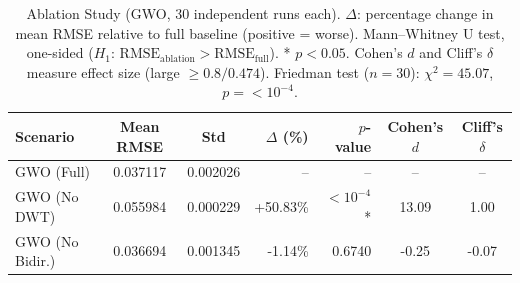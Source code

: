 \begin{table}[htbp]
\centering
\caption{Ablation Study (GWO, 30 independent runs each).
$\Delta$: percentage change in mean RMSE relative to full baseline (positive = worse).
Mann--Whitney U test, one-sided ($H_1$: $\mathrm{RMSE}_{\text{ablation}} > \mathrm{RMSE}_{\text{full}}$).
* $p < 0.05$. Cohen's $d$ and Cliff's $\delta$ measure effect size (large $\geq 0.8 / 0.474$).
Friedman test ($n=30$): $\chi^2 = 45.07$, $p = <10^{-4}$. }
\label{tab:ablation_gwo}
\begin{tabular}{lccrrcc}
\hline
\textbf{Scenario} & \textbf{Mean RMSE} & \textbf{Std} & \textbf{$\Delta$ (\%)} & \textbf{$p$-value} & \textbf{Cohen's $d$} & \textbf{Cliff's $\delta$} \\
\hline
    GWO (Full)         & 0.037117 & 0.002026 & -- & -- & -- & -- \\
    GWO (No DWT)    & 0.055984 & 0.000229 & +50.83\% & $<10^{-4}$* & 13.09 & 1.00 \\
    GWO (No Bidir.)    & 0.036694 & 0.001345 & -1.14\% & 0.6740 & -0.25 & -0.07 \\
\hline
\end{tabular}
\end{table}
